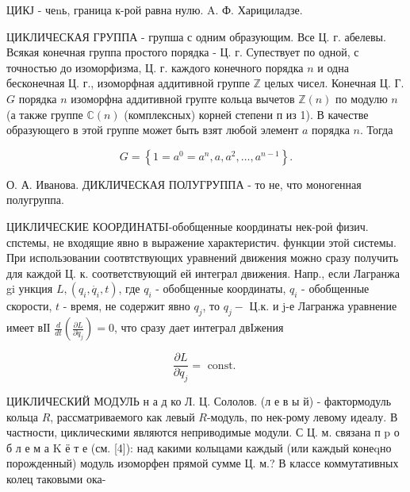 \documentclass[10pt]{article}
\begin{document}
ЦИКЈ - чеnь, граница к-рой равна нулю. A. Ф. Харициладзе.



ЦИКЛИЧЕСКАЯ ГРУППА - групша с одним образующим. Все Ц. г. абелевы. Всякая конечная группа простого порядка - Ц. г. Супествует по одной, с точностью до изоморфизма, Ц. г. каждого конечного порядка $n$ и одна бесконечная Ц. г., изоморфная аддитивной группе $\mathbb{Z}$ целых чисел. Конечная Ц. Г. $G$ порядка $n$ изоморфна аддитивной групте кольца вычетов $\mathbb{Z}(n)$ по модулю $n$ (а также группе $\mathbb{C}(n)$ (комплексных) корней степени п из 1). В качестве образующего в этой группе может быть взят любой элемент $a$ порядка $n$. Тогда



\[

G=\left\{1=a^{0}=a^{n}, a, a^{2}, \ldots, a^{n-1}\right\} .

\]



О. А. Иванова. ДИКЛИЧЕСКАЯ ПОЛУГРУППА - то не, что моногенная полугруппа.



ЦИКЛИЧЕСКИЕ КООРДИНАТБІ-обобщенные координаты нек-роӥ физич. спстемы, не входящие явно в выражение характеристич. функции этой системы. При использовании соотвтствующих уравнений движения можно сразу получить для каждой Ц. к. соответствующий ей интеграл движения. Напр., если Лагранжа gi ункция $L,\left(q_{i}, \dot{q_{i}}, t\right)$, где $q_{i}$ - обобщенные координаты, $q_{i}$ - обобщенные скорости, $t$ - время, не содержит явно $q_{j}$, то $q_{j}-$ Ц.к. и j-е Лагранжа уравнение имеет вІІ $\frac{d}{d t}\left(\frac{\partial L}{\partial \dot{q}_{j}}\right)=0$, что сразу дает интеграл двІжения



\[

\frac{\partial L}{\partial \dot{q}_{j}}=\text { const. }

\]



ЦИКЛИЧЕСКИЙ МОДУЛЬ н а д ко Л. Ц. Сололов. (л е в ы й) - фактормодуль кольца $R$, рассматриваемого как левый $R$-модуль, по нек-рому левому идеалу. В частности, циклическими являются неприводимые модули. С Ц. м. связана п $\mathrm{p}$ о б л е м а $\mathrm{K}$ ё т е (см. [4]): над какими колыцами каждый (или каждый конеqно порожденный) модуль изоморфен прямой сумме Ц. м.? В классе коммутативных колец таковыми ока-
\end{document}
